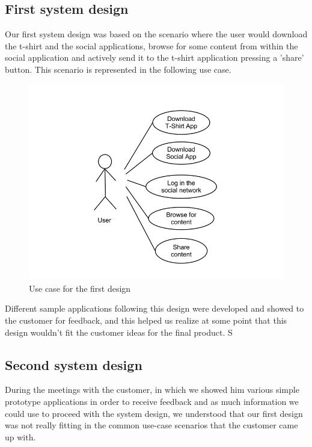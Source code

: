 \newpage

\subsection{First system design}
Our first system design was based on the scenario where the user would download the t-shirt
and the social applications, browse for some content from within the social application
and actively send it to the t-shirt application pressing a 'share' button.
This scenario is represented in the following use case.

\begin{figure}[h!]
\centering \includegraphics[scale=0.35]{img/use-case1.png}
\caption{Use case for the first design}
\label{fig:use-case1}
\end{figure}

Different sample applications following this design were developed and showed to the
customer for feedback, and this helped us realize at some point that this design wouldn't fit
the customer ideas for the final product. S

\subsection{Second system design}
During the meetings with the customer, in which we showed him various simple prototype applications
in order to receive feedback and as much information we could use to proceed with the system design,
we understood that our first design was not really fitting in the common use-case scenarios
that the customer came up with.

